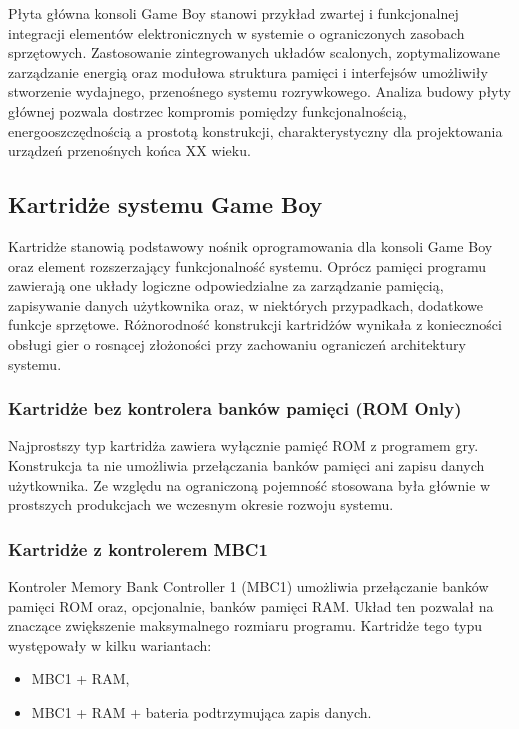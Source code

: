 \documentclass{article}
\begin{document}
Płyta główna konsoli Game Boy stanowi przykład zwartej i funkcjonalnej integracji elementów elektronicznych w systemie o ograniczonych zasobach sprzętowych. Zastosowanie zintegrowanych układów scalonych, zoptymalizowane zarządzanie energią oraz modułowa struktura pamięci i interfejsów umożliwiły stworzenie wydajnego, przenośnego systemu rozrywkowego. Analiza budowy płyty głównej pozwala dostrzec kompromis pomiędzy funkcjonalnością, energooszczędnością a prostotą konstrukcji, charakterystyczny dla projektowania urządzeń przenośnych końca XX wieku.

\subsection{Kartridże systemu Game Boy}

Kartridże stanowią podstawowy nośnik oprogramowania dla konsoli Game Boy oraz element rozszerzający funkcjonalność systemu. Oprócz pamięci programu zawierają one układy logiczne odpowiedzialne za zarządzanie pamięcią, zapisywanie danych użytkownika oraz, w niektórych przypadkach, dodatkowe funkcje sprzętowe. Różnorodność konstrukcji kartridżów wynikała z konieczności obsługi gier o rosnącej złożoności przy zachowaniu ograniczeń architektury systemu.

\subsubsection{Kartridże bez kontrolera banków pamięci (ROM Only)}

Najprostszy typ kartridża zawiera wyłącznie pamięć ROM z programem gry. Konstrukcja ta nie umożliwia przełączania banków pamięci ani zapisu danych użytkownika. Ze względu na ograniczoną pojemność stosowana była głównie w prostszych produkcjach we wczesnym okresie rozwoju systemu.

\subsubsection{Kartridże z kontrolerem MBC1}

Kontroler Memory Bank Controller 1 (MBC1) umożliwia przełączanie banków pamięci ROM oraz, opcjonalnie, banków pamięci RAM. Układ ten pozwalał na znaczące zwiększenie maksymalnego rozmiaru programu. Kartridże tego typu występowały w kilku wariantach:

\begin{itemize}
	\item MBC1 + RAM,
	\item MBC1 + RAM + bateria podtrzymująca zapis danych.
\end{itemize}
\end{document}
